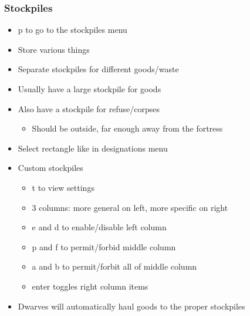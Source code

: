 \begin{frame}
\frametitle{Stockpiles}
\begin{itemize}
\item p to go to the stockpiles menu
\item Store various things
\item Separate stockpiles for different goods/waste
\item Usually have a large stockpile for goods
\item Also have a stockpile for refuse/corpses
\begin{itemize}
	\item Should be outside, far enough away from the fortress
\end{itemize}
\item Select rectangle like in designations menu
\item Custom stockpiles
\begin{itemize}
	\item t to view settings
	\item 3 columns: more general on left, more specific on right
	\item e and d to enable/disable left column
	\item p and f to permit/forbid middle column
	\item a and b to permit/forbit all of middle column
	\item enter toggles right column items
\end{itemize}
\item Dwarves will automatically haul goods to the proper stockpiles
\end{itemize}
\end{frame}
